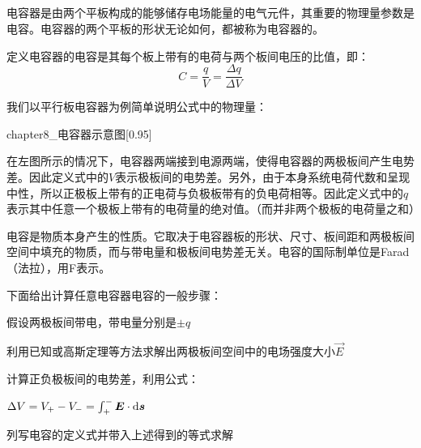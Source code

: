 \subsection[定义与计算]{}
电容器是由两个平板构成的能够储存电场能量的电气元件，其重要的物理量参数是电容。电容器的两个平板的形状无论如何，都被称为电容器的。

定义电容器的电容是其每个板上带有的电荷与两个板间电压的比值，即：
\[C=\dfrac{q}{V}=\dfrac{\Delta q}{\Delta V}\]

我们以平行板电容器为例简单说明公式中的物理量：
\vspace{2mm}

\begin{minipage}{0.45\textwidth}
    \begin{singlefigure}[电容器示意图]{chapter8_电容器示意图}[0.95]
    \end{singlefigure}
\end{minipage}
\begin{minipage}{0.5\textwidth}
    在左图所示的情况下，电容器两端接到电源两端，使得电容器的两极板间产生电势差。因此定义式中的$V$表示极板间的电势差。另外，由于本身系统电荷代数和呈现中性，所以正极板上带有的正电荷与负极板带有的负电荷相等。因此定义式中的$q$表示其中任意一个极板上带有的电荷量的绝对值。（而并非两个极板的电荷量之和）
\end{minipage}
\vspace{2mm}

电容是物质本身产生的性质。它取决于电容器板的形状、尺寸、板间距和两极板间空间中填充的物质，而与带电量和极板间电势差无关。电容的国际制单位是Farad（法拉），用F表示。

下面给出计算任意电容器电容的一般步骤：
\begin{Itemize}
    \item 假设两极板间带电，带电量分别是$\pm q$
    \item 利用已知或高斯定理等方法求解出两极板间空间中的电场强度大小$\vec{E}$
    \item 计算正负极板间的电势差，利用公式：
    \begin{center}
        $\Delta V=V_{+}-V_{-}=\int_{+}^{-} \vec{E}\cdot \dif{\vec{s}}$
    \end{center}
    \item 列写电容的定义式并带入上述得到的等式求解
\end{Itemize}

